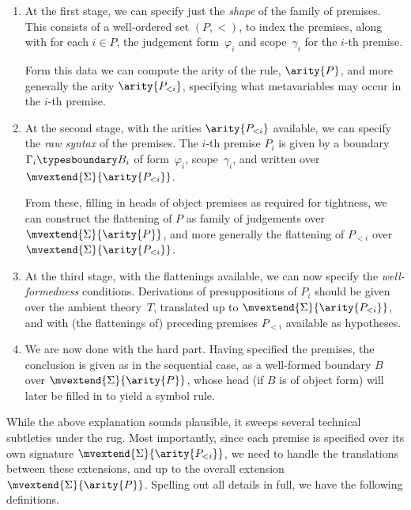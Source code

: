 \begin{enumerate}
\item
  At the first stage, we can specify just the \emph{shape} of the family of premises.
  This consists of a well-ordered set $(P,<)$, to index the premises,
  along with for each $i \in P$, the judgement form~$\varphi_i$ and scope~$\gamma_i$ for the $i$-th premise.

  Form this data we can compute the arity of the rule, $\arity{P}$, and more generally the arity $\arity{P_{<i}}$, specifying what metavariables may occur in the $i$-th premise.
  
\item
  At the second stage, with the arities $\arity{P_{<i}}$ available, we can specify the \emph{raw syntax} of the premises.
  The $i$-th premise $P_i$ is given by a boundary $\Gamma_i \typesboundary B_i$ of form~$\varphi_i$, scope~$\gamma_i$, and written over $\mvextend{\Sigma}{\arity{P_{<i}}}$.

  From these, filling in heads of object premises as required for tightness, we can construct the flattening of $P$ as family of judgements over $\mvextend{\Sigma}{\arity{P}}$, and more generally the flattening of $P_{<i}$ over $\mvextend{\Sigma}{\arity{P_{<i}}}$.

\item
  At the third stage, with the flattenings available, we can now specify the \emph{well-formedness} conditions.
  Derivations of presuppositions of $P_i$ should be given over the ambient theory~$T$, translated up to $\mvextend{\Sigma}{\arity{P_{<i}}}$, and with (the flattenings of) preceding premises $P_{<i}$ available as hypotheses.

\item
  We are now done with the hard part.
  Having specified the premises, the conclusion is given as in the sequential case, as a well-formed boundary $B$ over $\mvextend{\Sigma}{\arity{P}}$, whose head (if $B$ is of object form) will later be filled in to yield a symbol rule.
\end{enumerate}

While the above explanation sounds plausible, it sweeps several technical subtleties under the rug.
%
Most importantly, since each premise is specified over its own signature $\mvextend{\Sigma}{\arity{P_{<i}}}$, we need to handle the translations between these extensions, and up to the overall extension $\mvextend{\Sigma}{\arity{P}}$.
%
Spelling out all details in full, we have the following definitions.

